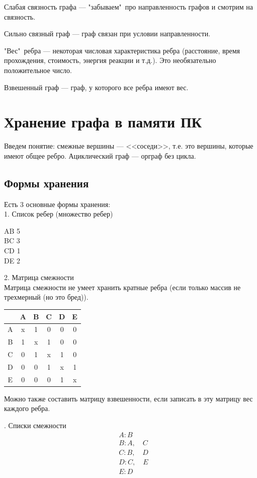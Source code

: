 \documentclass[a4paper,12pt]{article}
\theoremstyle{plain} %
\theoremstyle{definition} %
\theoremstyle{remark} %
\begin{document}
Слабая связность графа --- "забываем"\  про направленность графов и смотрим на связность.

Сильно связный граф --- граф связан при условии направленности.

"Вес"\  ребра --- некоторая числовая характеристика ребра (расстояние, время прохождения, стоимость, энергия реакции и т.д.). Это необязательно положительное число.

Взвешенный граф --- граф, у которого все ребра имеют вес.

\section{Хранение графа в памяти ПК}
Введем понятие: смежные вершины --- <<соседи>>, т.е. это вершины, которые имеют общее ребро. Ациклический граф --- орграф без цикла.

\subsection{Формы хранения}
Есть 3 основные формы хранения:\\
1. Список ребер (множество ребер)
\begin{center}
AB 5\\
BC 3\\
CD 1\\
DE 2\\
\end{center}
2. Матрица смежности\\
Матрица смежности не умеет хранить кратные ребра (если только массив не трехмерный (но это бред)).

\begin{center}
\begin{tabular}{|c|c|c|c|c|c|}
	\hline 
	& A & B & C & D & E \\ 
	\hline 
	A & x & 1 & 0 & 0 & 0 \\ 
	\hline 
	B & 1 & x & 1 & 0 & 0 \\ 
	\hline 
	C & 0 & 1 & x & 1 & 0 \\ 
	\hline 
	D & 0 & 0 & 1 & x & 1 \\ 
	\hline 
	E & 0 & 0 & 0 & 1 & x \\ 
	\hline 
\end{tabular}
\end{center}

Можно  также составить матрицу взвешенности, если записать в эту матрицу вес каждого ребра.

. Списки смежности\\
\begin{align*}
&A : B\\
&B : A, \quad C\\
&C : B, \quad D\\
&D : C, \quad E\\
&E : D\\
\end{align*}
\end{document}
